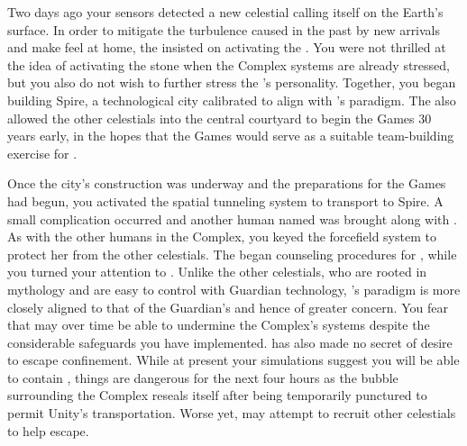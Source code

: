 \documentclass[char]{guardians}
\begin{document}
Two days ago your sensors detected a new celestial calling itself \cUnity{} on the Earth's surface. In order to mitigate the turbulence caused in the past by new arrivals and make \cUnity{} feel at home, the \cCaretaker{} insisted on activating the \stone{}. You were not thrilled at the idea of activating the stone when the Complex systems are already stressed, but you also do not wish to further stress the \cCaretaker{}'s personality. Together, you began building Spire, a technological city calibrated to align with \cUnity{}'s paradigm. The \cCaretaker{} also allowed the other celestials into the central courtyard to begin the Games 30 years early, in the hopes that the Games would serve as a suitable team-building exercise for \cUnity{}.

Once the city's construction was underway and the preparations for the Games had begun, you activated the spatial tunneling system to transport \cUnity{} to Spire. A small complication occurred and another human named \cKachiko{\intro} was brought along with \cUnity{}. As with the other humans in the Complex, you keyed the forcefield system to protect her from the other celestials. The \cCaretaker{} began counseling procedures for \cKachiko{}, while you turned your attention to \cUnity{}. Unlike the other celestials, who are rooted in mythology and are easy to control with Guardian technology, \cUnity{}'s paradigm is more closely aligned to that of the Guardian's and hence of greater concern. You fear that \cUnity{} may over time be able to undermine the Complex's systems despite the considerable safeguards you have implemented. \cUnity{} has also made no secret of \cUnity{\their} desire to escape confinement. While at present your simulations suggest you will be able to contain \cUnity{}, things are dangerous for the next four hours as the bubble surrounding the Complex reseals itself after being temporarily punctured to permit Unity's transportation. Worse yet, \cUnity{} may attempt to recruit other celestials to help \cUnity{\them} escape.
\end{document}
